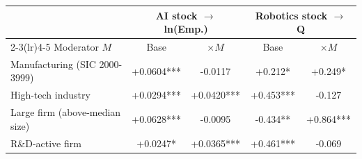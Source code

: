 \begin{tabular}{lcccc}
\toprule
& \multicolumn{2}{c}{AI stock $\to$ ln(Emp.)} & \multicolumn{2}{c}{Robotics stock $\to$ Q} \\
\cmidrule(lr){2-3}\cmidrule(lr){4-5}
Moderator $M$ & Base & $\times M$ & Base & $\times M$ \\
\midrule
Manufacturing (SIC 2000-3999) & +0.0604*** & -0.0117 & +0.212* & +0.249* \\
High-tech industry & +0.0294*** & +0.0420*** & +0.453*** & -0.127 \\
Large firm (above-median size) & +0.0628*** & -0.0095 & -0.434** & +0.864*** \\
R\&D-active firm & +0.0247* & +0.0365*** & +0.461*** & -0.069 \\
\bottomrule
\end{tabular}